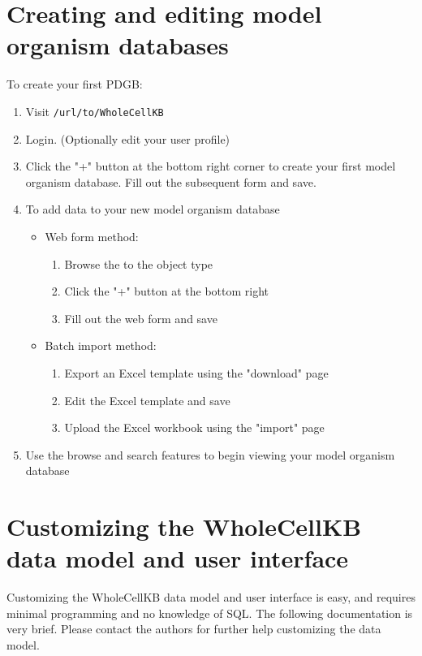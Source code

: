 \documentclass[twoside]{book}
\begin{document}
\chapter{\label{creating}Creating and editing model organism databases}
To create your first PDGB:
\begin{enumerate}
\item Visit \texttt{/url/to/WholeCellKB}
\item Login. (Optionally edit your user profile)
\item Click the "+" button at the bottom right corner to create your first model organism database. Fill out the subsequent form and save.
\item To add data to your new model organism database
	\begin{itemize}
	\item Web form method:
		\begin{enumerate}
		\item Browse the to the object type
		\item Click the "+" button at the bottom right
		\item Fill out the web form and save
		\end{enumerate}
	\item Batch import method:
		\begin{enumerate}
		\item Export an Excel template using the "download" page
		\item Edit the Excel template and save
		\item Upload the Excel workbook using the "import" page
		\end{enumerate}
	\end{itemize}
\item Use the browse and search features to begin viewing your model organism database
\end{enumerate}

\chapter{\label{data_model}Customizing the WholeCellKB data model and user interface}
Customizing the WholeCellKB data model and user interface is easy, and requires minimal programming and no knowledge of SQL. The following documentation is very brief. Please contact the authors for further help customizing the data model.
\end{document}
